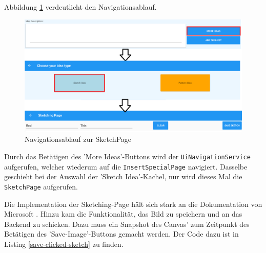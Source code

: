 Abbildung \ref{fig:sketch-page} verdeutlicht den Navigationsablauf.

\begin{figure}[h]
	\centering
	\includegraphics[width=1\linewidth]{img/techn-bericht/sketch-page}
	\caption{Navigationsablauf zur SketchPage}
	\label{fig:sketch-page}
\end{figure}

Durch das Betätigen des 'More Ideas'-Buttons wird der \texttt{UiNavigationService} aufgerufen, welcher wiederum auf die \texttt{InsertSpecialPage} navigiert. Dasselbe geschieht bei der Auswahl der 'Sketch Idea'-Kachel, nur wird dieses Mal die  \texttt{SketchPage} aufgerufen. 

Die Implementation der Sketching-Page hält sich stark an die Dokumentation von Microsoft \cite{sketching-xf}. Hinzu kam die Funktionalität, das Bild zu speichern und an das Backend zu schicken. Dazu muss ein Snapshot des Canvas' zum Zeitpunkt des Betätigen des 'Save-Image'-Buttons gemacht werden. Der Code dazu ist in Listing \ref{save-clicked-sketch} zu finden.

